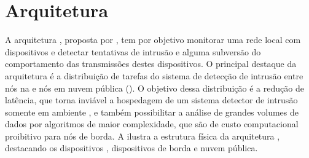 
\section{Arquitetura \idsiot}\label{sec:cassales}

A arquitetura \idsiot, proposta por , tem por objetivo
monitorar uma rede local com dispositivos \iot e detectar tentativas de intrusão
e alguma subversão do comportamento das transmissões destes dispositivos.
O principal destaque da arquitetura é a distribuição de tarefas do sistema de
detecção de intrusão entre nós na  e nós em nuvem pública
(\cloud).
O objetivo dessa distribuição é a redução de latência, que torna inviável a
hospedagem de um sistema detector de intrusão somente em ambiente \cloud, e
também possibilitar a análise de grandes volumes de dados por algoritmos de
maior complexidade, que são de custo computacional proibitivo para nós de borda.
A  ilustra a estrutura física da arquitetura \idsiot,
destacando os dispositivos \iot, dispositivos de borda e nuvem pública.

